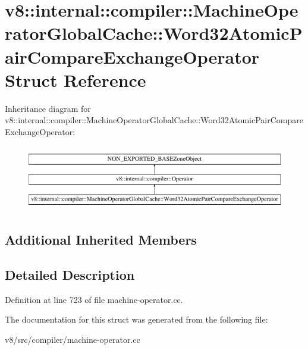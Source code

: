 \hypertarget{structv8_1_1internal_1_1compiler_1_1MachineOperatorGlobalCache_1_1Word32AtomicPairCompareExchangeOperator}{}\section{v8\+:\+:internal\+:\+:compiler\+:\+:Machine\+Operator\+Global\+Cache\+:\+:Word32\+Atomic\+Pair\+Compare\+Exchange\+Operator Struct Reference}
\label{structv8_1_1internal_1_1compiler_1_1MachineOperatorGlobalCache_1_1Word32AtomicPairCompareExchangeOperator}
Inheritance diagram for v8\+:\+:internal\+:\+:compiler\+:\+:Machine\+Operator\+Global\+Cache\+:\+:Word32\+Atomic\+Pair\+Compare\+Exchange\+Operator\+:\begin{figure}[H]
\begin{center}
\leavevmode
\includegraphics[height=2.876712cm]{structv8_1_1internal_1_1compiler_1_1MachineOperatorGlobalCache_1_1Word32AtomicPairCompareExchangeOperator}
\end{center}
\end{figure}
\subsection*{Additional Inherited Members}


\subsection{Detailed Description}


Definition at line 723 of file machine-\/operator.\+cc.



The documentation for this struct was generated from the following file\+:\begin{DoxyCompactItemize}
\item 
v8/src/compiler/machine-\/operator.\+cc\end{DoxyCompactItemize}
